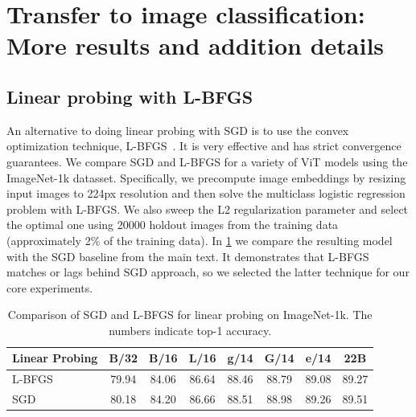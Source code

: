 \section{Transfer to image classification: More results and addition details}

\subsection{Linear probing with L-BFGS}\label{app:linear}
An alternative to doing linear probing with SGD is to use the convex optimization technique, L-BFGS~\citep{byrd1995limited}. It is very effective and has strict convergence guarantees. We compare SGD and L-BFGS for a variety of ViT models using the ImageNet-1k datasset. Specifically, we precompute image embeddings by resizing input images to 224px resolution and then solve the multiclass logistic regression problem with L-BFGS. We also sweep the L2 regularization parameter and select the optimal one using 20000 holdout images from the training data (approximately 2\% of the training data). In \cref{tab:app:bfgs} we compare the resulting model with the SGD baseline from the main text. It demonstrates that L-BFGS matches or lags behind SGD approach, so we selected the latter technique for our core experiments.

\begin{table}[h]
    \caption{Comparison of SGD and L-BFGS for linear probing on ImageNet-1k. The numbers indicate top-1 accuracy.}
\centering
\small
  \setlength{\tabcolsep}{4pt}
    \begin{tabular}{@{} l c c c c c c c @{}}
      \toprule
	    Linear Probing & B/32 & B/16 & L/16 & g/14 & G/14 & e/14 & 22B \\
      \midrule
      L-BFGS & 79.94 & 84.06 & 86.64 & 88.46 & 88.79 & 89.08 & 89.27 \\
      SGD & 80.18 & 84.20 & 86.66 & 88.51 & 88.98 & 89.26 & 89.51 \\
      \bottomrule
 \end{tabular}
    \label{tab:app:bfgs}
\end{table}


